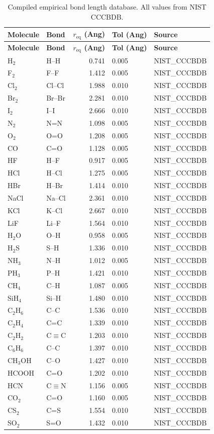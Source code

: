 \documentclass[11pt,twoside]{article}
\def\AA{Ang}%
\begin{document}
\begin{longtable}{llrll}
\caption{Compiled empirical bond length database. All values from NIST CCCBDB.} \\
\toprule
\textbf{Molecule} & \textbf{Bond} & \textbf{$r_{\mathrm{eq}}$ (\AA)} & \textbf{Tol (\AA)} & \textbf{Source} \\
\midrule
\endfirsthead
\toprule
\textbf{Molecule} & \textbf{Bond} & \textbf{$r_{\mathrm{eq}}$ (\AA)} & \textbf{Tol (\AA)} & \textbf{Source} \\
\midrule
\endhead
H$_2$ & H--H & 0.741 & 0.005 & NIST\_CCCBDB \\
F$_2$ & F--F & 1.412 & 0.005 & NIST\_CCCBDB \\
Cl$_2$ & Cl--Cl & 1.988 & 0.010 & NIST\_CCCBDB \\
Br$_2$ & Br--Br & 2.281 & 0.010 & NIST\_CCCBDB \\
I$_2$ & I--I & 2.666 & 0.010 & NIST\_CCCBDB \\
N$_2$ & N=N & 1.098 & 0.005 & NIST\_CCCBDB \\
O$_2$ & O=O & 1.208 & 0.005 & NIST\_CCCBDB \\
CO & C=O & 1.128 & 0.005 & NIST\_CCCBDB \\
HF & H--F & 0.917 & 0.005 & NIST\_CCCBDB \\
HCl & H--Cl & 1.275 & 0.005 & NIST\_CCCBDB \\
HBr & H--Br & 1.414 & 0.010 & NIST\_CCCBDB \\
NaCl & Na--Cl & 2.361 & 0.010 & NIST\_CCCBDB \\
KCl & K--Cl & 2.667 & 0.010 & NIST\_CCCBDB \\
LiF & Li--F & 1.564 & 0.010 & NIST\_CCCBDB \\
H$_2$O & O--H & 0.958 & 0.005 & NIST\_CCCBDB \\
H$_2$S & S--H & 1.336 & 0.010 & NIST\_CCCBDB \\
NH$_3$ & N--H & 1.012 & 0.005 & NIST\_CCCBDB \\
PH$_3$ & P--H & 1.421 & 0.010 & NIST\_CCCBDB \\
CH$_4$ & C--H & 1.087 & 0.005 & NIST\_CCCBDB \\
SiH$_4$ & Si--H & 1.480 & 0.010 & NIST\_CCCBDB \\
C$_2$H$_6$ & C--C & 1.536 & 0.010 & NIST\_CCCBDB \\
C$_2$H$_4$ & C=C & 1.339 & 0.010 & NIST\_CCCBDB \\
C$_2$H$_2$ & C$\equiv$C & 1.203 & 0.010 & NIST\_CCCBDB \\
C$_6$H$_6$ & C--C & 1.397 & 0.010 & NIST\_CCCBDB \\
CH$_3$OH & C--O & 1.427 & 0.010 & NIST\_CCCBDB \\
HCOOH & C=O & 1.202 & 0.010 & NIST\_CCCBDB \\
HCN & C$\equiv$N & 1.156 & 0.005 & NIST\_CCCBDB \\
CO$_2$ & C=O & 1.160 & 0.005 & NIST\_CCCBDB \\
CS$_2$ & C=S & 1.554 & 0.010 & NIST\_CCCBDB \\
SO$_2$ & S=O & 1.432 & 0.010 & NIST\_CCCBDB \\
\bottomrule
\end{longtable}
\end{document}
